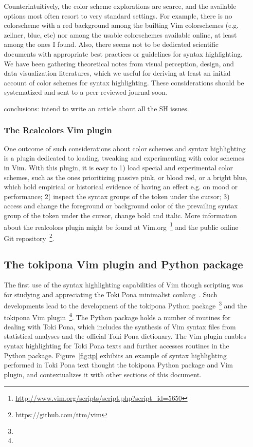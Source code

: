 \documentclass{article}
\begin{document}
Counterintuitively, the color scheme explorations are scarce,
and the available options most often resort to very standard settings.
For example, there is no colorscheme with a red background
among the builting Vim colorschemes (e.g. zellner, blue, etc)
nor among the usable colorschemes available online,
at least among the ones I found.
Also, there seems not to be dedicated scientific documents
with appropriate best practices or guidelines for syntax highlighting.
We have been gathering theoretical notes from visual perception, design,
and data visualization literatures, which we useful for
deriving at least an initial account of color schemes
for syntax highlighting.
These considerations should be systematized and sent
to a peer-reviewed journal soon.


conclusions: intend to write an article about all the SH issues.

\subsubsection{The Realcolors Vim plugin}
One outcome of such considerations about color schemes
and syntax highlighting is a plugin dedicated
to loading, tweaking and experimenting with color schemes in Vim.
With this plugin, it is easy to 1) load special and experimental color schemes, such as the ones prioritizing passive pink, or blood red, or a bright blue, which hold empirical or historical evidence of having an effect e.g. on mood or performance; 2) inspect the syntax groups of the token under the cursor; 3) access and change the foreground or background color of the prevailing syntax group of the token under the cursor, change bold and italic.
More information about the realcolors plugin might be found at
Vim.org~\footnote{\url{http://www.vim.org/scripts/script.php?script_id=5650}} and the public online Git repository~\footnote{https://github.com/ttm/vim}.

\subsection{The tokipona Vim plugin and Python package}
The first use of the syntax highlighting capabilities of Vim
though scripting was for studying and appreciating
the Toki Pona minimalist conlang~\cite{tpBook}.
Such developments lead to the development
of the tokipona Python package~\footnote{}
and the tokipona Vim plugin~\footnote{}.
The Python package
holds a number of routines for dealing with Toki Pona,
which includes the synthesis of Vim syntax files from
statistical analyses and the official Toki Pona dictionary.
The Vim plugin enables syntax highlighting for Toki Pona texts
and further accesses routines in the Python package.
Figure~\ref{fig:tp} exhibits an example of
syntax highlighting performed in Toki Pona text
thought the tokipona Python package and Vim plugin,
and contextualizes it with other sections of this document.
\end{document}
